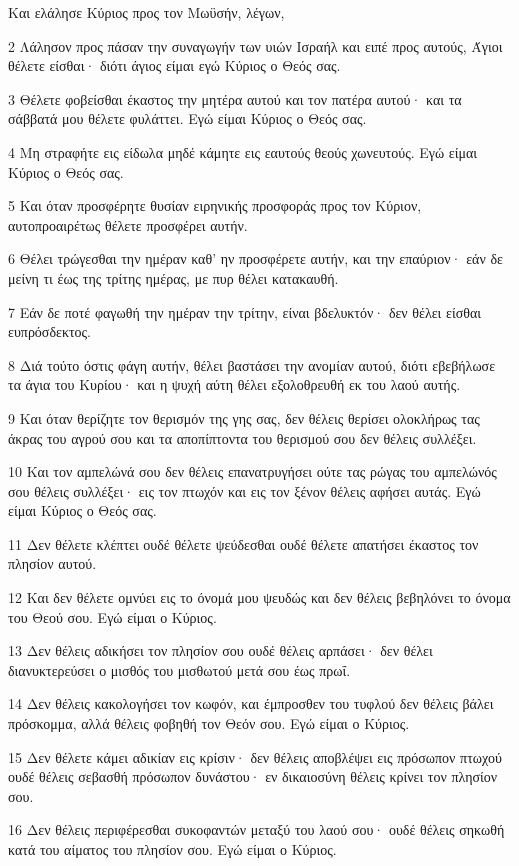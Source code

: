 \par Και ελάλησε Κύριος προς τον Μωϋσήν, λέγων,
\par 2 Λάλησον προς πάσαν την συναγωγήν των υιών Ισραήλ και ειπέ προς αυτούς, Άγιοι θέλετε είσθαι· διότι άγιος είμαι εγώ Κύριος ο Θεός σας.
\par 3 Θέλετε φοβείσθαι έκαστος την μητέρα αυτού και τον πατέρα αυτού· και τα σάββατά μου θέλετε φυλάττει. Εγώ είμαι Κύριος ο Θεός σας.
\par 4 Μη στραφήτε εις είδωλα μηδέ κάμητε εις εαυτούς θεούς χωνευτούς. Εγώ είμαι Κύριος ο Θεός σας.
\par 5 Και όταν προσφέρητε θυσίαν ειρηνικής προσφοράς προς τον Κύριον, αυτοπροαιρέτως θέλετε προσφέρει αυτήν.
\par 6 Θέλει τρώγεσθαι την ημέραν καθ' ην προσφέρετε αυτήν, και την επαύριον· εάν δε μείνη τι έως της τρίτης ημέρας, με πυρ θέλει κατακαυθή.
\par 7 Εάν δε ποτέ φαγωθή την ημέραν την τρίτην, είναι βδελυκτόν· δεν θέλει είσθαι ευπρόσδεκτος.
\par 8 Διά τούτο όστις φάγη αυτήν, θέλει βαστάσει την ανομίαν αυτού, διότι εβεβήλωσε τα άγια του Κυρίου· και η ψυχή αύτη θέλει εξολοθρευθή εκ του λαού αυτής.
\par 9 Και όταν θερίζητε τον θερισμόν της γης σας, δεν θέλεις θερίσει ολοκλήρως τας άκρας του αγρού σου και τα αποπίπτοντα του θερισμού σου δεν θέλεις συλλέξει.
\par 10 Και τον αμπελώνά σου δεν θέλεις επανατρυγήσει ούτε τας ρώγας του αμπελώνός σου θέλεις συλλέξει· εις τον πτωχόν και εις τον ξένον θέλεις αφήσει αυτάς. Εγώ είμαι Κύριος ο Θεός σας.
\par 11 Δεν θέλετε κλέπτει ουδέ θέλετε ψεύδεσθαι ουδέ θέλετε απατήσει έκαστος τον πλησίον αυτού.
\par 12 Και δεν θέλετε ομνύει εις το όνομά μου ψευδώς και δεν θέλεις βεβηλόνει το όνομα του Θεού σου. Εγώ είμαι ο Κύριος.
\par 13 Δεν θέλεις αδικήσει τον πλησίον σου ουδέ θέλεις αρπάσει· δεν θέλει διανυκτερεύσει ο μισθός του μισθωτού μετά σου έως πρωΐ.
\par 14 Δεν θέλεις κακολογήσει τον κωφόν, και έμπροσθεν του τυφλού δεν θέλεις βάλει πρόσκομμα, αλλά θέλεις φοβηθή τον Θεόν σου. Εγώ είμαι ο Κύριος.
\par 15 Δεν θέλετε κάμει αδικίαν εις κρίσιν· δεν θέλεις αποβλέψει εις πρόσωπον πτωχού ουδέ θέλεις σεβασθή πρόσωπον δυνάστου· εν δικαιοσύνη θέλεις κρίνει τον πλησίον σου.
\par 16 Δεν θέλεις περιφέρεσθαι συκοφαντών μεταξύ του λαού σου· ουδέ θέλεις σηκωθή κατά του αίματος του πλησίον σου. Εγώ είμαι ο Κύριος.
